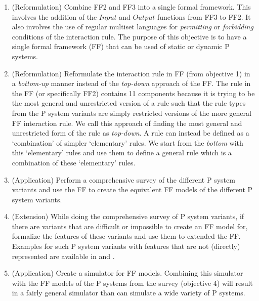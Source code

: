 \documentclass{article}
\begin{document}
\begin{enumerate}                                                                                    
   \item (Reformulation) Combine FF2 and FF3 into a single formal framework. This involves the       
         addition of the $Input$ and $Output$ functions from FF3 to FF2. It also involves the use of 
         regular multiset languages for \emph{permitting} or \emph{forbidding} conditions of the     
         interaction rule. The purpose of this objective is to have a single formal framework (FF)   
         that can be used of static or dynamic P systems.                                            
   \item (Reformulation) Reformulate the interaction rule in FF (from objective 1) in a              
         \emph{bottom-up} manner instead of the \emph{top-down} approach of the FF. The rule in the  
         FF (or specifically FF2) contains 11 components because it is trying to be the most general 
         and unrestricted version of a rule such that the rule types from the P system variants are  
         simply restricted versions of the more general FF interaction rule. We call this approach   
         of finding the most general and unrestricted form of the rule as \emph{top-down}. A rule    
         can instead be defined as a `combination' of simpler `elementary' rules. We start from the  
         \emph{bottom} with this `elementary' rules and use them to define a general rule which is   
         a combination of these `elementary' rules.                                                  
   \item (Application) Perform a comprehensive survey of the different P system variants and use the 
         FF to create the equivalent FF models of the different P system variants.                   
   \item (Extension) While doing the comprehensive survey of P system variants, if there are         
         variants that are difficult or impossible to create an FF model for, formalize the features 
         of these variants and use them to extended the FF. Examples for such P system variants with 
         features that are not (directly) represented are available in \cite{polymorphic} and        
         \cite{rule-create}.                                                                         
   \item (Application) Create a simulator for FF models. Combining this simulator with the FF models 
        of the P systems from the survey (objective 4) will result in a fairly general simulator     
        than can simulate a wide variety of P systems.                                               
\end{enumerate} 




\end{document}
